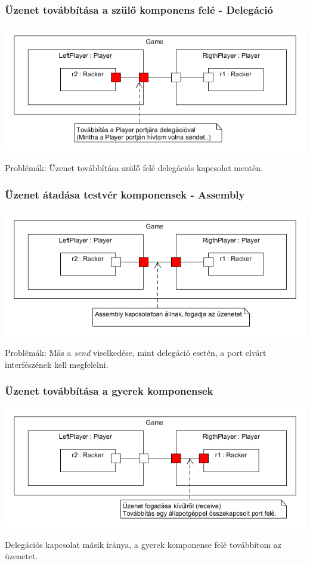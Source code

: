 \documentclass[11pt]{beamer}
\begin{document}
\begin{frame}
	\frametitle{Üzenet továbbítása a szülő komponens felé - Delegáció}
	\begin{center}
	\includegraphics[scale=0.5]{vedes_demo_connect.png}
	\end{center}
	
	Problémák: Üzenet továbbítása szülő felé delegációs kapcsolat mentén.

\end{frame}


\begin{frame}
	\frametitle{Üzenet átadása testvér komponensek - Assembly}
	\begin{center}
	\includegraphics[scale=0.5]{vedes_demo_assconnect.png}
	\end{center}
	Problémák: Más a \textit{send} viselkedése, mint delegáció esetén, a port elvárt interfészének kell megfelelni. 
		
\end{frame}


\begin{frame}
	\frametitle{Üzenet továbbítása a gyerek komponensek}
	\begin{center}
	\includegraphics[scale=0.5]{vedes_demo_recived.png}
	\end{center}
	Delegációs kapcsolat másik iránya, a gyerek komponense felé továbbítom az üzenetet.
\end{frame}
\end{document}
